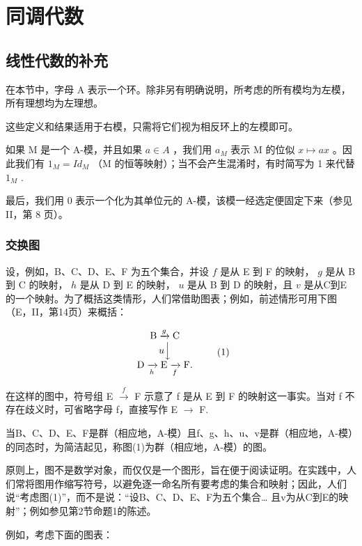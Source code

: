 \chapter{同调代数}

\section{线性代数的补充}

在本节中，字母 A 表示一个环。除非另有明确说明，所考虑的所有模均为左模，所有理想均为左理想。

这些定义和结果适用于右模，只需将它们视为相反环上的左模即可。

如果 M 是一个 A-模，并且如果 \(a \in A\) ，我们用 \(a_{M}\) 表示 M 的位似 \(x \mapsto ax\) 。因此我们有 \(1_{M} = Id_{M}\) （M 的恒等映射）；当不会产生混淆时，有时简写为 1 来代替 \(1_{M}\) .

最后，我们用 0 表示一个化为其单位元的 A-模，该模一经选定便固定下来（参见 II，第 8 页）。

\subsection{交换图}

设，例如，B、C、D、E、F 为五个集合，并设 \(f\) 是从 E 到 F 的映射， \(g\) 是从 B 到 C 的映射， \(h\) 是从 D 到 E 的映射， \(u\) 是从 B 到 D 的映射，且 \(v\) 是从C到E的一个映射。为了概括这类情形，人们常借助图表；例如，前述情形可用下图（E，II，第14页）来概括：

\[
\begin{array}{c} \mathrm{B} \xrightarrow {g} \mathrm{C} \\ u \Big \downarrow \\ \mathrm{D} \xrightarrow [ h ]{} \mathrm{E} \xrightarrow [ f ]{} \mathrm{F}. \end{array}\tag{1}
\]

在这样的图中，符号组 E \(\xrightarrow{f}\) F 示意了 f 是从 E 到 F 的映射这一事实。当对 f 不存在歧义时，可省略字母 f，直接写作 E \(\rightarrow\) F.

当B、C、D、E、F是群（相应地，A-模）且f、g、h、u、v是群（相应地，A-模）的同态时，为简洁起见，称图(1)为群（相应地，A-模）的图。

原则上，图不是数学对象，而仅仅是一个图形，旨在便于阅读证明。在实践中，人们常将图用作缩写符号，以避免逐一命名所有要考虑的集合和映射；因此，人们说“考虑图(1)”，而不是说：“设B、C、D、E、F为五个集合\ldots{} 且v为从C到E的映射”；例如参见第2节命题1的陈述。

例如，考虑下面的图表：

